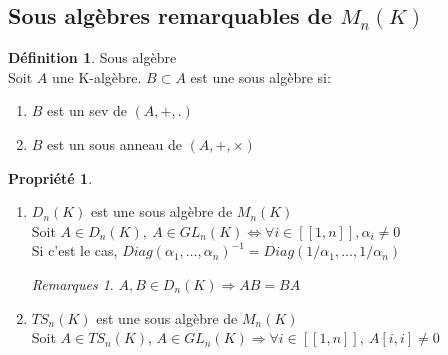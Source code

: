 \documentclass[fleqn]{article}
\theoremstyle{definition} \newtheorem*{defi}{D\'efinition}
\theoremstyle{definition} \newtheorem*{theo}{Th\'eor\`eme}
\theoremstyle{definition} \newtheorem*{coro}{Corollaire}
\theoremstyle{definition} \newtheorem*{nota}{Notation}
\theoremstyle{definition} \newtheorem*{vocab}{Vocabulaire}
\theoremstyle{remark} \newtheorem*{rqs}{Remarques}
\theoremstyle{definition} \newtheorem*{prop}{Propri\'et\'e}
\begin{document}
\subsection{Sous alg\`ebres remarquables de $M_n(K)$}
\begin{defi} Sous alg\`ebre \\
	Soit $A$ une K-alg\`ebre. $B \subset A$ est une sous alg\`ebre si:
	\begin{enumerate}
		\item $B$ est un sev de $(A, +, .)$
		\item $B$ est un sous anneau de $(A,+,\times)$
	\end{enumerate}
\end{defi}

\begin{prop} $ $
	\begin{enumerate}
		\item $D_n(K)$ est une sous alg\`ebre de $M_n(K)$\\
			Soit $A \in D_n(K),\ A \in GL_n(K) \Leftrightarrow \forall i \in [\![1,n]\!], \alpha_i \neq 0$\\
			Si c'est le cas, $Diag(\alpha_1, \hdots, \alpha_n)^{-1} = Diag(1/\alpha_1, \hdots, 1/\alpha_n)$
			\begin{rqs} $A,B \in D_n(K) \Rightarrow AB = BA$ \end{rqs}
		\item $TS_n(K)$ est une sous alg\`ebre de $M_n(K)$ \\
			Soit $A \in TS_n(K)$, $A \in GL_n(K) \Rightarrow \forall i \in [\![1,n]\!],\ A[i,i] \neq 0$
	\end{enumerate}
\end{prop}
\end{document}
